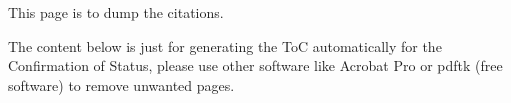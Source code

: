 \documentclass[../ThesisConfirmation]{subfiles}
\begin{document}
\doublespacing
\renewcommand\bibname{Publication List}
\printbibliography
\newpage
This page is to dump the citations.
\parencite{IEEEexample:confwithadddays} \parencite{IEEEexample:confwithvolume}

The content below is just for generating the ToC automatically for the Confirmation of Status, please use other software like Acrobat Pro or pdftk (free software) to remove unwanted pages.
\end{document}
